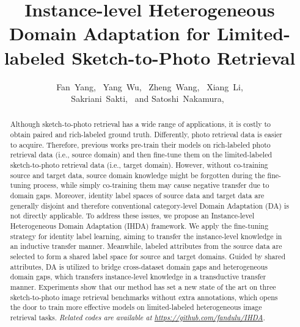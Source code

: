 \documentclass[journal]{IEEEtran}
\begin{document}
\title{Instance-level Heterogeneous Domain Adaptation for Limited-labeled Sketch-to-Photo Retrieval}


\author{Fan~Yang,~
        Yang~Wu,~ 
        Zheng~Wang,~
        Xiang~Li, \\
        Sakriani~Sakti,~
        and Satoshi~Nakamura,~

}



\maketitle


\begin{abstract}
Although sketch-to-photo retrieval has a wide range of applications, it is costly to obtain paired and rich-labeled ground truth. Differently, photo retrieval data is easier to acquire. Therefore, previous works pre-train their models on rich-labeled photo retrieval data (i.e., source domain) and then fine-tune them on the limited-labeled sketch-to-photo retrieval data (i.e., target domain). However, without co-training source and target data, source domain knowledge might be forgotten during the fine-tuning process, while simply co-training them may cause negative transfer due to domain gaps. Moreover, identity label spaces of source data and target data are generally disjoint and therefore conventional category-level Domain Adaptation (DA) is not directly applicable. To address these issues, we propose an Instance-level Heterogeneous Domain Adaptation (IHDA) framework. We apply the fine-tuning strategy for identity label learning, aiming to transfer the instance-level knowledge in an inductive transfer manner. Meanwhile, labeled attributes from the source data are selected to form a shared label space for source and target domains. Guided by shared attributes, DA is utilized to bridge cross-dataset domain gaps and heterogeneous domain gaps, which transfers instance-level knowledge in a transductive transfer manner. Experiments show that our method has set a new state of the art on three sketch-to-photo image retrieval benchmarks without extra annotations, which opens the door to train more effective models on limited-labeled heterogeneous image retrieval tasks. \emph{Related codes are available at \url{https://github.com/fandulu/IHDA}.}
\end{abstract}
\end{document}
